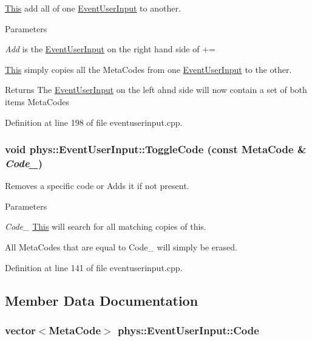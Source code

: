 \hyperlink{structThis}{This} add all of one \hyperlink{classphys_1_1EventUserInput}{EventUserInput} to another. 


\begin{DoxyParams}{Parameters}
\item[{\em Add}]is the \hyperlink{classphys_1_1EventUserInput}{EventUserInput} on the right hand side of +=\end{DoxyParams}
\hyperlink{structThis}{This} simply copies all the MetaCodes from one \hyperlink{classphys_1_1EventUserInput}{EventUserInput} to the other. \begin{DoxyReturn}{Returns}
The \hyperlink{classphys_1_1EventUserInput}{EventUserInput} on the left ahnd side will now contain a set of both items MetaCodes 
\end{DoxyReturn}


Definition at line 198 of file eventuserinput.cpp.

\hypertarget{classphys_1_1EventUserInput_adf603505c43162cf9331a486d5832f75}{
\subsubsection[{ToggleCode}]{\setlength{\rightskip}{0pt plus 5cm}void phys::EventUserInput::ToggleCode (const {\bf MetaCode} \& {\em Code\_\-})}}
\label{d7/df5/classphys_1_1EventUserInput_adf603505c43162cf9331a486d5832f75}


Removes a specific code or Adds it if not present. 


\begin{DoxyParams}{Parameters}
\item[{\em Code\_\-}]\hyperlink{structThis}{This} will search for all matching copies of this.\end{DoxyParams}
All MetaCodes that are equal to Code\_\- will simply be erased. 

Definition at line 141 of file eventuserinput.cpp.



\subsection{Member Data Documentation}
\hypertarget{classphys_1_1EventUserInput_aee3dc1d8cac82482651487c48c6c60c9}{
\subsubsection[{Code}]{\setlength{\rightskip}{0pt plus 5cm}vector$<${\bf MetaCode}$>$ {\bf phys::EventUserInput::Code}}}
\label{d7/df5/classphys_1_1EventUserInput_aee3dc1d8cac82482651487c48c6c60c9}


